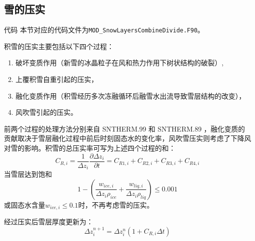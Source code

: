 \subsection{雪的压实}\label{雪的压实}
\begin{mymdframed}{代码}
本节对应的代码文件为\texttt{MOD\_SnowLayersCombineDivide.F90}。
\end{mymdframed}

积雪的压实主要包括以下四个过程：
\begin{enumerate}
\item 破坏变质作用（新雪的冰晶粒子在风和热力作用下树状结构的破裂）,
\item 上覆积雪自重引起的压实，
\item 融化变质作用（积雪经历多次冻融循环后融雪水出流导致雪层结构的改变），
\item 风吹雪引起的压实。
\end{enumerate}

前两个过程的处理方法分别来自 SNTHERM.99 \citep{jordan1999heat}和 SNTHERM.89 \citep{jordan1991one}，融化变质的贡献取决于雪层融化过程中前后时刻固态水的变化率，风吹雪压实则考虑了下降风对雪的影响。积雪的总压实率可写为上述四个过程的和：
%
\begin{equation}
C_{R,i}=\frac{1}{\Delta {z_i}} \frac{\partial \Delta {z_i}}{\partial {t}}=C_{R1,i}+C_{R2,i}+C_{R3,i}+C_{R4,i}
\end{equation}
当雪层达到饱和
\begin{equation}
1-\left(\frac{w_{ice,i}}{ \Delta {z_i} \rho_{ice}}+\frac{w_{liq,i}}{ \Delta {z_i} \rho_{liq}}\right) \leqslant 0.001
\end{equation}
或固态水含量$w_{ice,i}\leqslant0.1$时，不再考虑雪的压实。

经过压实后雪层厚度更新为：
\begin{equation}
\Delta z_i^{n+1}=\Delta z_i^n\left(1+C_{R, i} \Delta t\right)
\end{equation}


